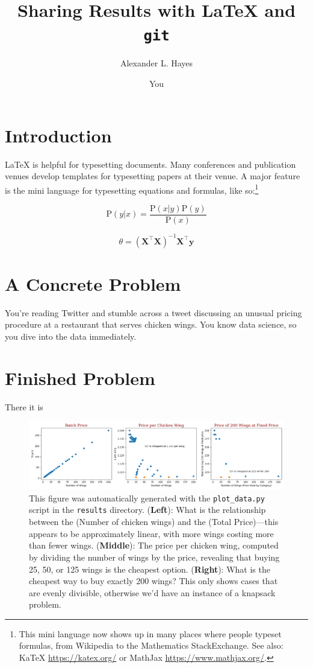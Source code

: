 \documentclass{article}
\title{Sharing Results with \LaTeX{} and \texttt{git}}
\author{Alexander L. Hayes \and You}
\date{}
\begin{document}
\maketitle

\section{Introduction}

\LaTeX{} is helpful for typesetting documents. Many conferences and
publication venues develop templates for typesetting papers at their
venue. A major feature is the mini language for typesetting
equations and formulas, like so:\footnote{This mini language now
shows up in many places where people typeset formulas, from Wikipedia to the
Mathematics StackExchange. See also: KaTeX \url{https://katex.org/}
or MathJax \url{https://www.mathjax.org/}.}

$$\mathrm{P}(y | x) = \frac{\mathrm{P}(x | y)\mathrm{P}(y)}{\mathrm{P}(x)}$$

$$\theta = (\mathbf{X}^{\top}\mathbf{X})^{-1} \mathbf{X}^{\top} \mathbf{y}$$

\section{A Concrete Problem}

You're reading Twitter and stumble across a tweet discussing an unusual pricing
procedure at a restaurant that serves chicken wings. You know data science,
so you dive into the data immediately.

\section{Finished Problem}

There it is 

\begin{figure}[h]
    \includegraphics[width=\textwidth]{chicken_wing_plots.png}
    \caption{This figure was automatically generated with the
    \texttt{plot\_data.py} script in the \texttt{results} directory.
    (\textbf{Left}): What is the relationship between the (Number of
    chicken wings) and the (Total Price)---this appears to be
    approximately linear, with more wings costing more than fewer wings.
    (\textbf{Middle}): The price per chicken wing, computed by dividing
    the number of wings by the price, revealing that buying 25, 50, or
    125 wings is the cheapest option.
    (\textbf{Right}): What is the cheapest way to buy exactly 200 wings?
    This only shows cases that are evenly divisible,
    otherwise we'd have an instance of a knapsack problem.~\citep{wiki:Knapsack_problem}}
\end{figure}



\end{document}
